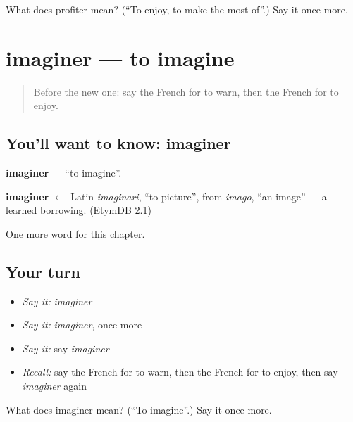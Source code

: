 \begin{tcolorbox}[breakable,colback=teal!4,colframe=teal!35!black,title={Before you move on}]
What does profiter mean? (\textquotedblleft{}To enjoy, to make the most of\textquotedblright{}.) Say it once more.
\end{tcolorbox}
\section[imaginer]{imaginer — to imagine}

\label{lesson:FR-C209-imaginer}



\begin{quote}
Before the new one: say the French for to warn, then the French for to enjoy.
\end{quote}

\subsection*{You'll want to know: imaginer}
\textbf{imaginer} — \textquotedblleft{}to imagine\textquotedblright{}.

\begin{cousinweb}
\textbf{imaginer} $\leftarrow$ Latin \emph{imaginari}, \textquotedblleft{}to picture\textquotedblright{}, from \emph{imago}, \textquotedblleft{}an image\textquotedblright{} — a learned borrowing. (EtymDB 2.1)
\end{cousinweb}

\begin{grammarlens}[title={What you've built}]
One more word for this chapter.
\end{grammarlens}

\subsection*{Your turn}
\begin{itemize}
\raggedright
  \item \emph{Say it:} \emph{imaginer}
  \item \emph{Say it:} \emph{imaginer}, once more
  \item \emph{Say it:} say \emph{imaginer}
  \item \emph{Recall:} say the French for to warn, then the French for to enjoy, then say \emph{imaginer} again
\end{itemize}

\begin{tcolorbox}[breakable,colback=teal!4,colframe=teal!35!black,title={Before you move on}]
What does imaginer mean? (\textquotedblleft{}To imagine\textquotedblright{}.) Say it once more.
\end{tcolorbox}
